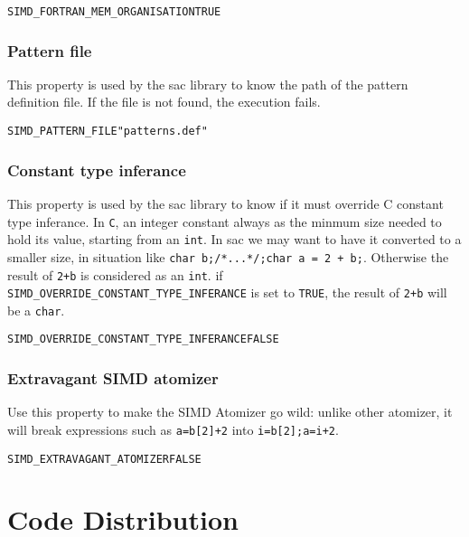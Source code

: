 \documentclass[a4paper]{report}
\newenvironment{PipsProp}{\begin{alltt}}{\end{alltt}}
\begin{document}
\begin{PipsProp}
SIMD_FORTRAN_MEM_ORGANISATION TRUE
\end{PipsProp}

\subsubsection*{Pattern file}

This property is used by the sac library to know the path of the pattern definition file.
If the file is not found, the execution fails.

\begin{PipsProp}
SIMD_PATTERN_FILE "patterns.def"
\end{PipsProp}

\subsubsection*{Constant type inferance}

This property is used by the sac library to know if it must override C constant type inferance.
In \texttt{C}, an integer constant always as the minmum size needed to hold its value, starting from an \lstinline|int|. In sac we may want to have it converted to a smaller size, in situation like \lstinline|char b;/*...*/;char a = 2 + b;|. Otherwise the result of \lstinline|2+b| is considered as an \lstinline|int|.
if \verb|SIMD_OVERRIDE_CONSTANT_TYPE_INFERANCE| is set to \texttt{TRUE}, the result of \lstinline|2+b| will be a \lstinline|char|.

\begin{PipsProp}
SIMD_OVERRIDE_CONSTANT_TYPE_INFERANCE FALSE
\end{PipsProp}

\subsubsection*{Extravagant SIMD atomizer}
Use this property to make the SIMD Atomizer go wild: unlike other atomizer, it will break
expressions such as \lstinline|a=b[2]+2| into \lstinline|i=b[2];a=i+2|.
\begin{PipsProp}
SIMD_EXTRAVAGANT_ATOMIZER FALSE
\end{PipsProp}


\section{Code Distribution}
\label{subsection-code-distribution}
\end{document}
